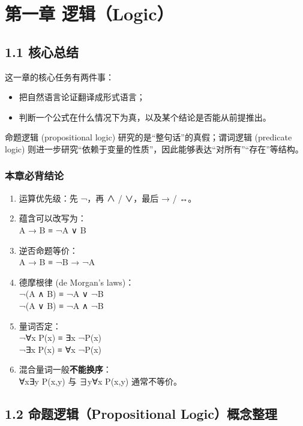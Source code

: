 \documentclass[
  11pt,
]{article}
\providecommand{\tightlist}{%
  \setlength{\itemsep}{0pt}\setlength{\parskip}{0pt}}
\begin{document}
\section{第一章
逻辑（Logic）}\label{ux7b2cux4e00ux7ae0-ux903bux8f91logic}

\subsection{1.1 核心总结}\label{ux6838ux5fc3ux603bux7ed3}

这一章的核心任务有两件事：

\begin{itemize}
\tightlist
\item
  把自然语言论证翻译成形式语言；
\item
  判断一个公式在什么情况下为真，以及某个结论是否能从前提推出。
\end{itemize}

命题逻辑 (propositional logic) 研究的是``整句话''的真假；谓词逻辑
(predicate logic)
则进一步研究``依赖于变量的性质''，因此能够表达``对所有''``存在''等结构。

\subsubsection{本章必背结论}\label{ux672cux7ae0ux5fc5ux80ccux7ed3ux8bba}

\begin{enumerate}
\def\labelenumi{\arabic{enumi}.}
\tightlist
\item
  运算优先级：先 ¬，再 ∧ / ∨，最后 → / ↔。\\
\item
  蕴含可以改写为：\\
  A → B ≡ ¬A ∨ B
\item
  逆否命题等价：\\
  A → B ≡ ¬B → ¬A
\item
  德摩根律 (de Morgan's laws)：\\
  ¬(A ∧ B) ≡ ¬A ∨ ¬B\\
  ¬(A ∨ B) ≡ ¬A ∧ ¬B
\item
  量词否定：\\
  ¬∀x P(x) ≡ ∃x ¬P(x)\\
  ¬∃x P(x) ≡ ∀x ¬P(x)
\item
  混合量词一般\textbf{不能换序}：\\
  ∀x∃y P(x,y) 与 ∃y∀x P(x,y) 通常不等价。
\end{enumerate}

\subsection{1.2 命题逻辑（Propositional
Logic）概念整理}\label{ux547dux9898ux903bux8f91propositional-logicux6982ux5ff5ux6574ux7406}
\end{document}
